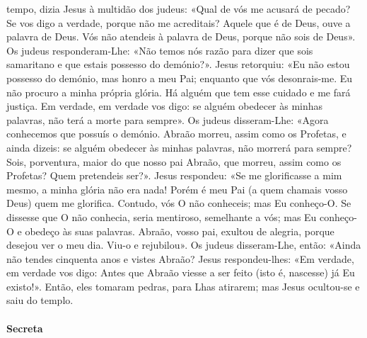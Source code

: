 \begin{paracol}{2}
{ tempo, dizia Jesus à multidão dos judeus: «Qual de vós me acusará de pecado? Se vos digo a verdade, porque não me acreditais? Aquele que é de Deus, ouve a palavra de Deus. Vós não atendeis à palavra de Deus, porque não sois de Deus». Os judeus responderam-Lhe: «Não temos nós razão para dizer que sois samaritano e que estais possesso do demónio?». Jesus retorquiu: «Eu não estou possesso do demónio, mas honro a meu Pai; enquanto que vós desonrais-me. Eu não procuro a minha própria glória. Há alguém que tem esse cuidado e me fará justiça. Em verdade, em verdade vos digo: se alguém obedecer às minhas palavras, não terá a morte para sempre». Os judeus disseram-Lhe: «Agora conhecemos que possuís o demónio. Abraão morreu, assim como os Profetas, e ainda dizeis: se alguém obedecer às minhas palavras, não morrerá para sempre? Sois, porventura, maior do que nosso pai Abraão, que morreu, assim como os Profetas? Quem pretendeis ser?». Jesus respondeu: «Se me glorificasse a mim mesmo, a minha glória não era nada! Porém é meu Pai (a quem chamais vosso Deus) quem me glorifica. Contudo, vós O não conheceis; mas Eu conheço-O. Se dissesse que O não conhecia, seria mentiroso, semelhante a vós; mas Eu conheço-O e obedeço às suas palavras. Abraão, vosso pai, exultou de alegria, porque desejou ver o meu dia. Viu-o e rejubilou». Os judeus disseram-Lhe, então: «Ainda não tendes cinquenta anos e vistes Abraão? Jesus respondeu-lhes: «Em verdade, em verdade vos digo: Antes que Abraão viesse a ser feito (isto é, nascesse) já Eu existo!». Então, eles tomaram pedras, para Lhas atirarem; mas Jesus ocultou-se e saiu do templo.
}\end{paracol}

\begin{paracol}{2}\switchcolumn{}\end{paracol}

\paragraph{Secreta}
\begin{paracol}{2}\switchcolumn{}\end{paracol}

